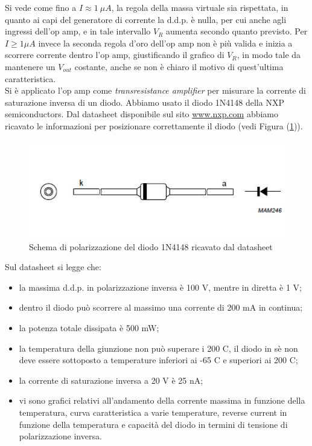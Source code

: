 \documentclass[journal, a4paper]{IEEEtran}
\begin{document}
Si vede come fino a $I\approx 1~\mu A$, la regola della massa virtuale sia rispettata, in quanto ai capi del generatore di corrente la d.d.p. è nulla, per cui anche agli ingressi dell'op amp, e in tale intervallo $V_R$ aumenta secondo quanto previsto. Per $I\geq 1 \mu A$ invece la seconda regola d'oro dell'op amp non è più valida e inizia a scorrere corrente dentro l'op amp, giustificando il grafico di $V_R$, in modo tale da mantenere un $V_{out}$ costante, anche se non è chiaro il motivo di quest'ultima caratteristica.\\

Si è applicato l'op amp come \textit{transresistance amplifier} per misurare la corrente di saturazione inversa di un diodo. Abbiamo usato il diodo 1N4148 della NXP semiconductors. Dal datasheet disponibile sul sito \url{www.nxp.com} abbiamo ricavato le informazioni per posizionare correttamente il diodo (vedi Figura (\ref{diodo})).

\begin{figure}[htp]
\centering
\includegraphics[scale=.45]{dido}
\caption{Schema di polarizzazione del diodo 1N4148 ricavato dal datasheet}
\label{diodo}
\end{figure}


Sul datasheet si legge che:

\begin{itemize}
\item la massima d.d.p. in polarizzazione inversa è 100 V, mentre in diretta è 1 V;
\item dentro il diodo può scorrere al massimo una corrente di 200 mA in continua;
\item la potenza totale dissipata è 500 mW;
\item la temperatura della giunzione non può superare i 200 C, il diodo in sè non deve essere sottoposto a temperature inferiori ai -65 C e superiori ai 200 C;
\item la corrente di saturazione inversa a 20 V è 25 nA;
\item vi sono grafici relativi all'andamento della corrente massima in funzione della temperatura, curva caratteristica a varie temperature, reverse current in funzione della temperatura e capacità del diodo in termini di tensione di polarizzazione inversa.\\
\end{itemize}
\end{document}
